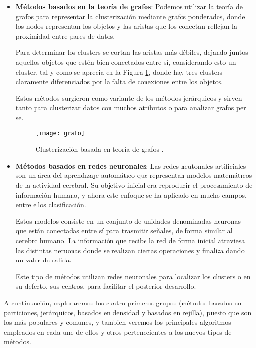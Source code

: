 \documentclass[10pt, a4paper]{article}
\begin{document}
\begin{itemize}
  \item \textbf{Métodos basados en la teoría de grafos}: Podemos utilizar la teoría de grafos \cite{teoria grafos} para representar la clusterización mediante grafos ponderados, donde los nodos representan los objetos y las aristas que los conectan reflejan la proximidad entre pares de datos. 
  
  Para determinar los clusters se cortan las aristas más débiles, dejando juntos aquellos objetos que estén bien conectados entre sí, considerando esto un cluster, tal y como se aprecia en la Figura \ref{fig:grafo}, donde hay tres clusters claramente diferenciados por la falta de conexiones entre los objetos.
  
  Estos métodos surgieron como variante de los métodos jerárquicos y sirven tanto para clusterizar datos con muchos atributos o para analizar grafos per se.
  
  
\begin{figure}[ht]
\centering
\texttt{[image: grafo]}
\caption{Clusterización basada en teoría de grafos \cite{foto grafo}.}
\label{fig:grafo}
\end{figure}
  
  \item \textbf{Métodos basados en redes neuronales}: Las redes neutonales artificiales son un área del aprendizaje automático que representan modelos matemáticos de la actividad cerebral. Su objetivo inicial era reproducir el procesamiento de información humano, y ahora este enfoque se ha aplicado en mucho campos, entre ellos clasificación. 
  
  Estos modelos consiste en un conjunto de unidades denominadas neuronas que están conectadas entre sí para trasmitir señales, de forma similar al cerebro humano. La información que recibe la red de forma inicial atraviesa las distintas neruonas donde se realizan ciertas operaciones y finaliza dando un valor de salida.
  
  Este tipo de métodos utilizan redes neuronales para localizar los clusters o en su defecto, sus centros, para facilitar el posterior desarrollo.
  
  
\end{itemize}


A continuación, exploraremos los cuatro primeros grupos (métodos basados en particiones, jerárquicos, basados en densidad y basados en rejilla), puesto que son los más populares y comunes, y tambien veremos los principales algoritmos empleados en cada uno de ellos y otros pertenecientes a los nuevos tipos de métodos.
\end{document}
